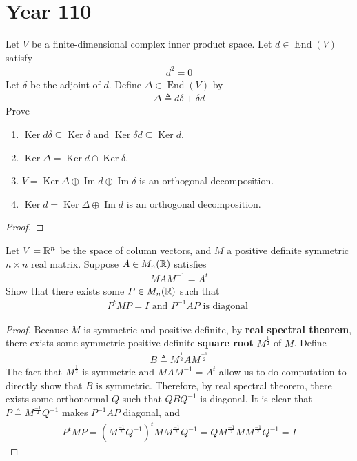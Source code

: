 \documentclass{report}
\begin{document}
\section{Year 110}
\begin{question}{}{}
Let $V$ be a finite-dimensional complex inner product space. Let $d\in \operatorname{End}(V)$ satisfy 
\begin{align*}
d^2=0
\end{align*}
Let $\delta$ be the adjoint of $d$. Define $\Delta \in \operatorname{End}(V)$ by 
\begin{align*}
\Delta \triangleq d\delta + \delta d
\end{align*}
Prove 
\begin{enumerate}[label=(\alph*)]
  \item $\operatorname{Ker}d\delta\subseteq \operatorname{Ker}\delta$ and $\operatorname{Ker}\delta d\subseteq \operatorname{Ker}d$.
  \item  $\operatorname{Ker}\Delta = \operatorname{Ker}d\cap \operatorname{Ker}\delta$. 
  \item $V= \operatorname{Ker}\Delta \oplus  \operatorname{Im}d \oplus  \operatorname{Im}\delta$ is an orthogonal decomposition. 
  \item $\operatorname{Ker}d=\operatorname{Ker}\Delta \oplus  \operatorname{Im}d$ is an orthogonal decomposition. 
\end{enumerate}
\end{question}
\begin{proof}



\end{proof}
\begin{question}{}{}
Let $V=\mathbb{R}^n$ be the space of column vectors, and  $M$ a positive definite symmetric  $n\times n$ real matrix. Suppose $A\in M_{n}(\mathbb{R})$ satisfies 
\begin{align*}
MAM^{-1}=A^t
\end{align*}
Show that there exists some $P \in M_n(\mathbb{R})$ such that 
\begin{align*}
P^t M P = I \text{ and }P^{-1}AP\text{ is diagonal }
\end{align*}
\end{question}
\begin{proof}
  Because $M$ is symmetric and positive definite, by \textbf{real spectral theorem}, there exists some symmetric positive definite \textbf{square root} $M^{\frac{1}{2}}$ of $M$.  Define 
\begin{align*}
B \triangleq M^{\frac{1}{2}}AM^{\frac{-1}{2}}
\end{align*}
The fact that $M^{\frac{1}{2}}$ is symmetric and $MAM^{-1}=A^t$ allow us to do computation to directly show that  $B$ is symmetric. Therefore, by real spectral theorem, there exists some orthonormal $Q$ such that  $QBQ^{-1}$ is diagonal. It is clear that $P\triangleq M^{\frac{-1}{2}}Q^{-1}$ makes $P^{-1}AP$ diagonal, and 
\begin{align*}
P^tMP= (M^{\frac{-1}{2}}Q^{-1})^t M M^{\frac{-1}{2}}Q^{-1}= Q M^{\frac{-1}{2}}MM^{\frac{-1}{2}}Q^{-1}=I
\end{align*}
\end{proof}
\end{document}

